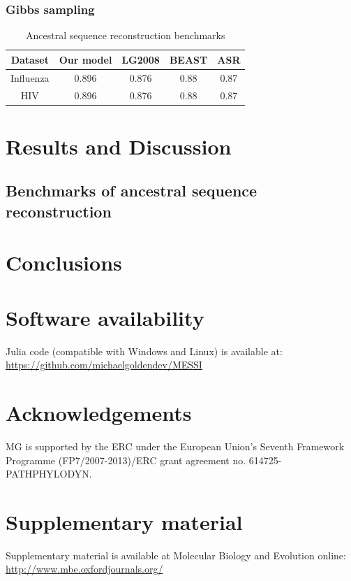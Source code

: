\documentclass[nogrid]{MBE}%
\begin{document}
\subsubsection{Gibbs sampling}


\begin{table}
	\captionsetup{justification=centering}
	\caption{\label{tab:sequencereconstruction} Ancestral sequence reconstruction benchmarks}	
	\begin{tabularx}{1.0\linewidth}{ccccc}
	\toprule
	Dataset & Our model & LG2008 & BEAST & ASR\\
	\midrule
	\rowcolor{black!20} Influenza & 0.896 & 0.876 & 0.88 & 0.87\tabularnewline
	HIV & 0.896 & 0.876 & 0.88 & 0.87\tabularnewline
	\bottomrule
	\end{tabularx}
\end{table}


\section{Results and Discussion}

\subsection{Benchmarks of ancestral sequence reconstruction}
	
\section{Conclusions}

\section{Software availability}
Julia code (compatible with Windows and Linux) is available at: \href{https://github.com/michaelgoldendev/MESSI}{https://github.com/michaelgoldendev/MESSI}

\section{Acknowledgements}
MG is supported by the ERC under the European Union’s Seventh Framework Programme (FP7/2007-2013)/ERC grant agreement no. 614725-PATHPHYLODYN. 

\ifmbeformat
\section{Supplementary material}
Supplementary material is available  at Molecular Biology and Evolution
online: \url{http://www.mbe.oxfordjournals.org/}
\fi

\end{document}
